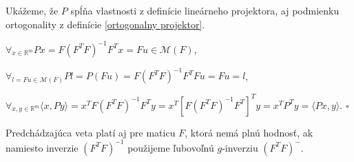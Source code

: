 \begin{dokaz}
Ukážeme, že $P$ spĺňa vlastnosti z definície lineárneho projektora, aj podmienku ortogonality z definície \ref{ortogonalny projektor}.
\begin{center}
$
{\forall}_{x \in \mathbb{R}^m} Px = F(F^T F)^{-1} F^T x = Fu \in \mathcal{M}(F)
$,
\end{center}
\begin{center}
$
{\forall}_{l = Fu \in \mathcal{M}(F)} Pl = P(Fu) = F(F^T F)^{-1} F^T F u = Fu = l
$,
\end{center}
\begin{center}
$
{\forall}_{x, y \in \mathbb{R}^m} \langle x, Py \rangle = x^T F(F^T F)^{-1} F^T y = x^T [F (F^T F)^{-1} F^T]^T y = x^T P^T y = \langle Px, y \rangle
$. $\square$
\end{center}
\end{dokaz}

\begin{theorem}
\label{ortogonalny projektor na maticu}
Predchádzajúca veta platí aj pre maticu $F$, ktorá nemá plnú hodnosť,
ak namiesto inverzie $(F^T F)^{-1}$ použijeme ľubovoľnú $g$-inverziu $(F^T F)^{-}$.
\end{theorem}